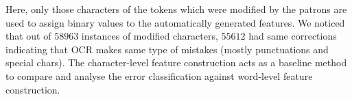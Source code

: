 \documentclass{acm_proc_article-sp}
\begin{document}
\begin{enumerate}
\begin{itemize}
Here, only those characters of the tokens which were modified by the patrons are used to assign binary values to the automatically generated features.
We noticed that out of $58963$ instances of modified characters, $55612$ had same corrections indicating that OCR makes same type of mistakes (mostly punctuations and special chars). The character-level feature construction acts as a baseline method to compare and analyse the error classification against word-level feature construction.


\end{itemize}
\end{enumerate}
\end{document}
